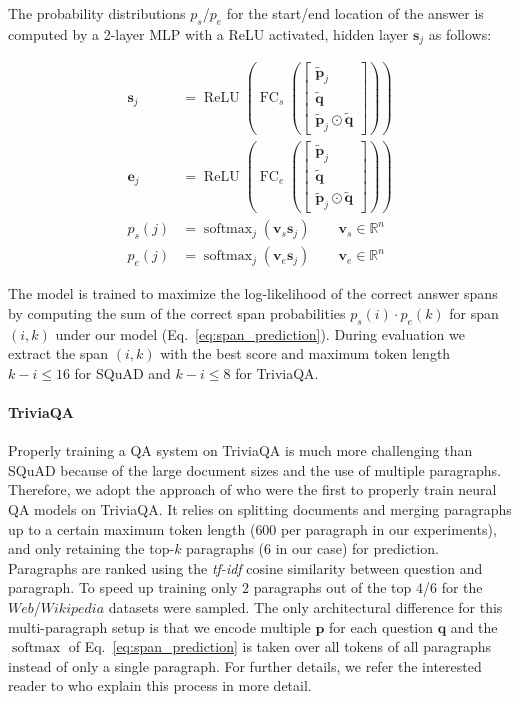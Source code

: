 \documentclass[11pt,a4paper]{article}
\begin{document}
The probability distributions $p_s$/$p_e$ for the start/end location of the answer is computed by a 2-layer MLP with a ReLU activated, hidden layer $\boldsymbol{s}_j$ as follows:

\begin{align}
    \mathbf{s}_j &= \operatorname{ReLU}  \left(\operatorname{FC}_s\left( \begin{bmatrix} \tilde{\mathbf{p}}_j \\ \tilde{\mathbf{q}} \\ \tilde{\mathbf{p}}_j \odot  \tilde{\mathbf{q}} \end{bmatrix} \right) \right) \nonumber\\
    \mathbf{e}_j &= \operatorname{ReLU}  \left(\operatorname{FC}_e\left( \begin{bmatrix} \tilde{\mathbf{p}}_j \\ \tilde{\mathbf{q}} \\ \tilde{\mathbf{p}}_j \odot  \tilde{\mathbf{q}} \end{bmatrix} \right) \right)
    \nonumber \\
    p_{s}(j) &= \operatorname{softmax}_j(\mathbf{v}_s \mathbf{s}_j) \qquad \mathbf{v}_s \in \mathbb{R}^n \nonumber \\
    p_{e}(j) &= \operatorname{softmax}_j(\mathbf{v}_e \mathbf{s}_j) \qquad \mathbf{v}_e \in \mathbb{R}^n
    \label{eq:span_prediction}
\end{align}

The model is trained to maximize the log-likelihood of the correct answer spans by computing the sum of the correct span probabilities  $p_{s}(i) \cdot p_{e}(k)$ for span $(i, k)$ under our model (Eq.~\ref{eq:span_prediction}). During evaluation we extract the span $(i, k)$ with the best score and maximum token length $k-i \le 16$ for SQuAD and $k-i \le 8$ for TriviaQA.

\paragraph{TriviaQA} Properly training a QA system on TriviaQA is much more challenging than SQuAD because of the large document sizes and the use of multiple paragraphs. Therefore, we adopt the approach of  who were the first to properly train neural QA models on TriviaQA. It relies on splitting documents and merging paragraphs up to a certain maximum token length ($600$ per paragraph in our experiments), and only retaining the top-$k$ paragraphs ($6$ in our case) for prediction. Paragraphs are ranked using the \textit{tf-idf} cosine similarity between question and paragraph. To speed up training only $2$ paragraphs out of the top $4$/$6$ for the $Web$/$Wikipedia$ datasets were sampled. The only architectural difference for this multi-paragraph setup is that we encode multiple $\boldsymbol{p}$ for each question $\boldsymbol{q}$ and the $\operatorname{softmax}$ of Eq.~\ref{eq:span_prediction} is taken over all tokens of all paragraphs instead of only a single paragraph. For further details, we refer the interested reader to  who explain this process in more detail.
\end{document}

